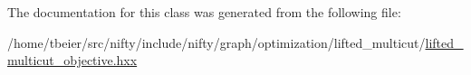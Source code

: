 The documentation for this class was generated from the following file\+:\begin{DoxyCompactItemize}
\item 
/home/tbeier/src/nifty/include/nifty/graph/optimization/lifted\+\_\+multicut/\hyperlink{graph_2optimization_2lifted__multicut_2lifted__multicut__objective_8hxx}{lifted\+\_\+multicut\+\_\+objective.\+hxx}\end{DoxyCompactItemize}
